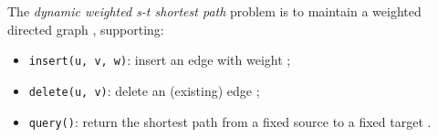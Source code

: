 \documentclass[11pt]{article}
\begin{document}
The \emph{dynamic weighted s-t shortest path} problem is to maintain a weighted directed graph , supporting:
\begin{itemize}
	\item
		\verb+insert(u, v, w)+: insert an edge  with weight ;
	\item
		\verb+delete(u, v)+: delete an (existing) edge ;
	\item
		\verb+query()+: return the shortest path from a fixed source  to a fixed target .
\end{itemize}

\iftoggle{conf}{
\section{Preliminaries on Cell-probe Model}\label{sectcp_app}
\cellprobepre

\section{Preliminaries on Communication Complexity}\label{sectpre_app}
\sectprecomm

\section{Full Version}
}{}
\end{document}
